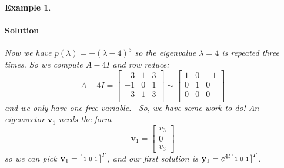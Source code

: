 \documentclass[letterpaper, 11pt, openany]{book}
\theoremstyle{mytheoremstyle}
\theoremstyle{myexamplestyle}
\newtheorem{example}{Example}[section]
\newenvironment{solution}{\paragraph{\sffamily \smaller \fontseries{b}\selectfont Solution}}{\hfill\faSquare}
\begin{document}
\begin{example}
\begin{enumerate}
        \begin{solution}
            Now we have \(p(\lambda) = - (\lambda - 4)^3\) so the eigenvalue \(\lambda = 4\) is repeated three times. So we compute \(A - 4I\) and row reduce:
            \[A - 4I = \left[
                \begin{array}{ccc}
                 -3 & 1 & 3 \\
                 -1 & 0 & 1 \\
                 -3 & 1 & 3 \\
                \end{array}
                \right]
                \sim
                \left[
                \begin{array}{ccc}
                1 & 0 & -1 \\
                0 & 1 & 0 \\
                0 & 0 & 0 \\
                \end{array}
                \right]
                \]
            and we only have one free variable. \faMeh \ So, we have some work to do! An eigenvector \(\mathbf{v}_1\) needs the form
            \[\mathbf{v}_1 = \begin{bmatrix}v_3 \\ 0 \\ v_3\end{bmatrix}\]
            so we can pick \(\mathbf{v}_1 = \begin{bsmallmatrix}1 & 0 & 1\end{bsmallmatrix}^{T}\), and our first solution is \(\mathbf{y}_1 = e^{4t} \begin{bsmallmatrix}1 & 0 & 1\end{bsmallmatrix}^{T}\).


\end{solution}
\end{enumerate}
\end{example}
\end{document}
